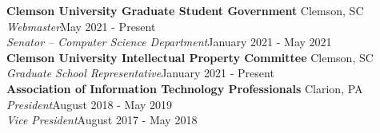 \documentclass[letter]{article}
\begin{document}

                \textbf{Clemson University Graduate Student Government} \hfill Clemson, SC\\
            \textit{Webmaster}\hfill{}May 2021 - Present\\
            \textit{Senator -- Computer Science Department}\hfill{}January 2021 - May 2021\\
    \vspace{\interspace}
                \textbf{Clemson University Intellectual Property Committee} \hfill Clemson, SC\\
        \textit{Graduate School Representative}\hfill{}January 2021 - Present\\
    \vspace{\interspace}
                \textbf{Association of Information Technology Professionals} \hfill Clarion, PA\\
            \textit{President}\hfill{}August 2018 - May 2019\\
            \textit{Vice President}\hfill{}August 2017 - May 2018\\
    \vspace{\interspace}
    \vspace{-\interspace}



\end{document}
